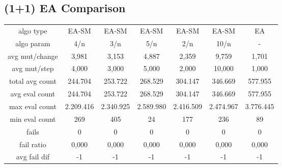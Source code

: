 \subsection{(1+1) EA Comparison}

\begin{tabular}[h]{ccccccc}
algo type&               EA-SM&        EA-SM&        EA-SM&        EA-SM&        EA-SM&           EA\\
algo param&                4/n&          3/n&          5/n&          2/n&         10/n&            -\\
avg mut/change&          3,981&        3,153&        4,887&        2,359&        9,759&        1,701\\
avg mut/step&            4,000&        3,000&        5,000&        2,000&       10,000&        1,000\\
\hline
total avg count&       244.704&      253.722&      268.529&      304.147&      346.669&      577.955\\
avg eval count&        244.704&      253.722&      268.529&      304.147&      346.669&      577.955\\
max eval count&      2.209.416&    2.340.925&    2.589.980&    2.416.509&    2.474.967&    3.776.445\\
min eval count&            269&          405&           24&          177&          236&           89\\
\hline
fails&                       0&            0&            0&            0&            0&            0\\
fail ratio&              0,000&        0,000&        0,000&        0,000&        0,000&        0,000\\
avg fail dif&               -1&           -1&           -1&           -1&           -1&           -1\\
\end{tabular}

